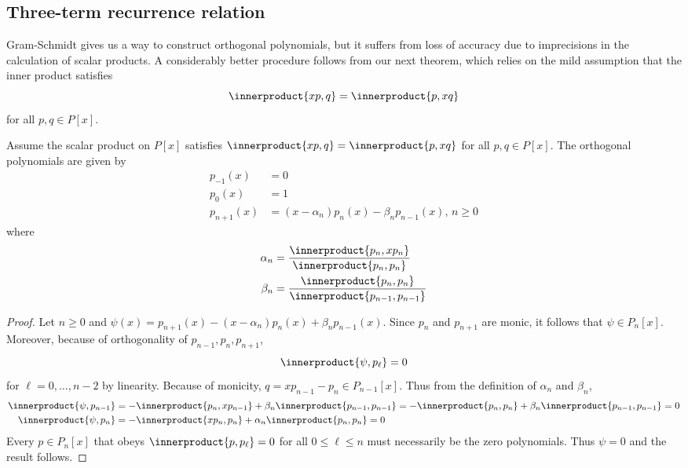 \documentclass[a4paper]{article}
\newcommand*{\inner}{\innerproduct}
\begin{document}
\subsection{Three-term recurrence relation}

Gram-Schmidt gives us a way to construct orthogonal polynomials, but it suffers from loss of accuracy due to imprecisions in the calculation of scalar products. A considerably better procedure follows from our next theorem, which relies on the mild assumption that the inner product satisfies
\[
  \inner{xp, q} = \inner{p, xq}
\]
for all \(p, q \in P[x]\).

\begin{theorem}
  Assume the scalar product on \(P[x]\) satisfies \(\inner{xp, q} = \inner{p, xq}\) for all \(p, q \in P[x]\). The orthogonal polynomials are given by
  \begin{align*}
    p_{-1}(x) &= 0 \\
    p_{0}(x) &= 1 \\
    p_{n + 1}(x) &= (x - \alpha_n)p_n(x) - \beta_np_{n - 1}(x),\, n \geq 0
  \end{align*}
  where
  \begin{align*}
    \alpha_n &= \frac{\inner{p_n, xp_n}}{\inner{p_n, p_n}} \\
    \beta_n &= \frac{\inner{p_n, p_n}}{\inner{p_{n - 1}, p_{n - 1}}}
  \end{align*}
\end{theorem}

\begin{proof}
  Let \(n \geq 0\) and \(\psi(x) = p_{n + 1}(x) - (x - \alpha_n)p_n(x) + \beta_np_{n - 1}(x)\). Since \(p_n\) and \(p_{n + 1}\) are monic, it follows that \(\psi \in P_n[x]\). Moreover, because of orthogonality of \(p_{n - 1}, p_n, p_{n + 1}\),
  \[
    \inner{\psi, p_\ell} = 0
  \]
  for \(\ell = 0, \dots, n - 2\) by linearity. Because of monicity, \(q = xp_{n - 1} - p_n \in P_{n - 1}[x]\). Thus from the definition of \(\alpha_n\) and \(\beta_n\),
  \begin{align*}
    \inner{\psi, p_{n - 1}} &= -\inner{p_n, xp_{n - 1}} + \beta_n\inner{p_{n - 1}, p_{n - 1}} = -\inner{p_n, p_n} + \beta_n\inner{p_{n - 1}, p_{n - 1}} = 0 \\
    \inner{\psi, p_n} &= -\inner{xp_n, p_n} + \alpha_n\inner{p_n, p_n} = 0
  \end{align*}
  Every \(p \in P_n[x]\) that obeys \(\inner{p, p_\ell} = 0\) for all \(0 \leq \ell \leq n\) must necessarily be the zero polynomials. Thus \(\psi = 0\) and the result follows.
\end{proof}
\end{document}
